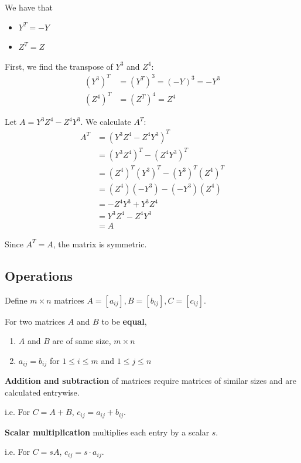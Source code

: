 \documentclass[../linear-algebra.tex]{subfiles}
\begin{document}
\noindent We have that
\begin{itemize}
    \item $Y^T = -Y$
    \item $Z^T = Z$
\end{itemize}

\noindent First, we find the transpose of $Y^3$ and $Z^4$:
\begin{align*}
    (Y^3)^T &= (Y^T)^3 = (-Y)^3 = -Y^3 \\
    (Z^4)^T &= (Z^T)^4 = Z^4
\end{align*}

\noindent Let $A = Y^3Z^4 - Z^4Y^3$. We calculate $A^T$:
\begin{align*}
    A^T &= (Y^3Z^4 - Z^4Y^3)^T \\
    &= (Y^3Z^4)^T - (Z^4Y^3)^T \tag{Distributive property} \\
    &= (Z^4)^T (Y^3)^T - (Y^3)^T (Z^4)^T \tag{Reversal law} \\
    &= (Z^4)(-Y^3) - (-Y^3)(Z^4) \tag{Substitution} \\
    &= -Z^4Y^3 + Y^3Z^4 \\
    &= Y^3Z^4 - Z^4Y^3 \\
    &= A
\end{align*}

\noindent Since $A^T = A$, the matrix is symmetric.

\subsection{Operations}
Define $m\times n$ matrices $A = [a_{ij}], B=[b_{ij}], C=[c_{ij}]$.

\noindent For two matrices $A$ and $B$ to be \textbf{equal},
\begin{enumerate}
    \item $A$ and $B$ are of same size, $m\times n$
    \item $a_{ij} = b_{ij}$ for $1\leq i\leq m$ and $1\leq j\leq n$
\end{enumerate}

\noindent \textbf{Addition and subtraction} of matrices require matrices of similar sizes
and are calculated entrywise.

i.e. For $C=A+B$, $c_{ij} = a_{ij} + b_{ij}$.

\noindent \textbf{Scalar multiplication} multiplies each entry by a scalar $s$.

i.e. For $C=sA$, $c_{ij} = s\cdot a_{ij}$.

\bigskip
\end{document}
